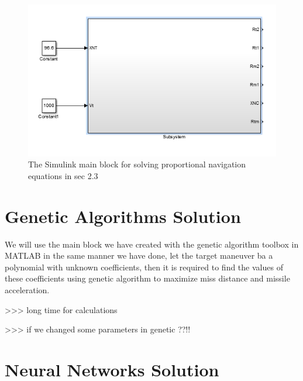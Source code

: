\begin{figure}[htb]
	\centering
	\includegraphics[scale = 0.75]{fig/PNmainBlock.PNG}
	\caption{The Simulink main block for solving proportional navigation equations in sec 2.3}
	\label{PN main block}
\end{figure}


\section{Genetic Algorithms Solution}
We will use the main block we have created with the genetic algorithm toolbox in MATLAB in the same manner we have done, let the target maneuver ba a polynomial with unknown coefficients, then it is required to find the values of these coefficients using genetic algorithm to maximize miss distance and missile acceleration.


>>> long time for calculations

>>> if we changed some parameters in genetic ??!!

\section{Neural Networks Solution}
